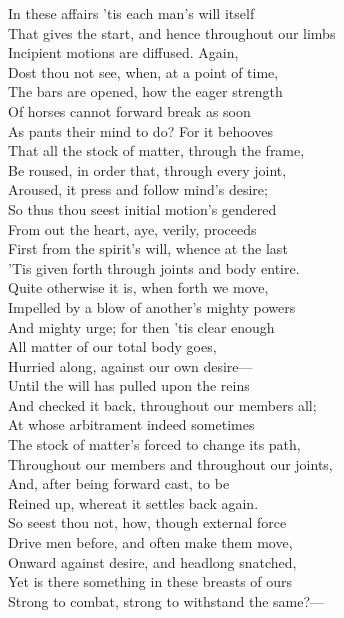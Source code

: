 In these affairs 'tis each man's will itself\\
That gives the start, and hence throughout our limbs\\
Incipient motions are diffused. Again,\\
Dost thou not see, when, at a point of time,\\
The bars are opened, how the eager strength\\
Of horses cannot forward break as soon\\
As pants their mind to do? For it behooves\\
That all the stock of matter, through the frame,\\
Be roused, in order that, through every joint,\\
Aroused, it press and follow mind's desire;\\
So thus thou seest initial motion's gendered\\
From out the heart, aye, verily, proceeds\\
First from the spirit's will, whence at the last\\
'Tis given forth through joints and body entire.\\
Quite otherwise it is, when forth we move,\\
Impelled by a blow of another's mighty powers\\
And mighty urge; for then 'tis clear enough\\
All matter of our total body goes,\\
Hurried along, against our own desire—\\
Until the will has pulled upon the reins\\
And checked it back, throughout our members all;\\
At whose arbitrament indeed sometimes\\
The stock of matter's forced to change its path,\\
Throughout our members and throughout our joints,\\
And, after being forward cast, to be\\
Reined up, whereat it settles back again.\\
So seest thou not, how, though external force\\
Drive men before, and often make them move,\\
Onward against desire, and headlong snatched,\\
Yet is there something in these breasts of ours\\
Strong to combat, strong to withstand the same?—\\
